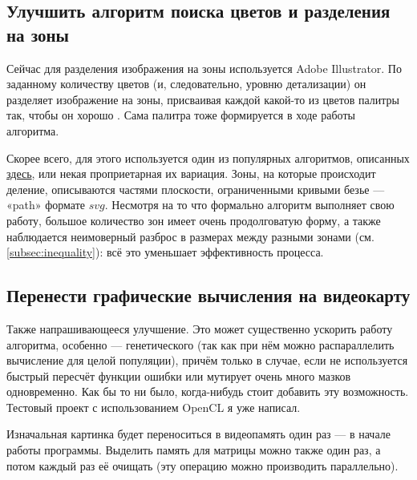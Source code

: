 

\subsection{Улучшить алгоритм поиска цветов и разделения на зоны}\label{subsec:posterisation_and_zoning}

Сейчас для разделения изображения на зоны используется Adobe Illustrator.
По заданному количеству цветов (и, следовательно, уровню детализации) он разделяет изображение на зоны,
присваивая каждой какой-то из цветов палитры так, чтобы он хорошо .
Сама палитра тоже формируется в ходе работы алгоритма.

Скорее всего, для этого используется один из популярных алгоритмов, описанных \href{https://en.wikipedia.org/wiki/Color_quantization}{здесь}, или некая проприетарная их вариация.
Зоны, на которые происходит деление, описываются частями плоскости, ограниченными кривыми безье — «path»  формате $svg$.
Несмотря на то что формально алгоритм выполняет свою работу, большое количество зон имеет очень продолговатую форму,
а также наблюдается неимоверный разброс в размерах между разными зонами (см. \ref{subsec:inequality}):
всё это уменьшает эффективность процесса.


\subsection{Перенести графические вычисления на видеокарту}\label{subsec:move_graphics_to_videocard}
Также напрашивающееся улучшение.
Это может существенно ускорить работу алгоритма, особенно — генетического (так как при нём можно распараллелить вычисление для целой популяции),
причём только в случае, если не используется быстрый пересчёт функции ошибки или мутирует очень много мазков одновременно.
Как бы то ни было, когда-нибудь стоит добавить эту возможность.
Тестовый проект с использованием OpenCL я уже написал.

Изначальная картинка будет переноситься в видеопамять один раз — в начале работы программы.
Выделить память для матрицы можно также один раз, а потом каждый раз её очищать (эту операцию можно производить параллельно).

